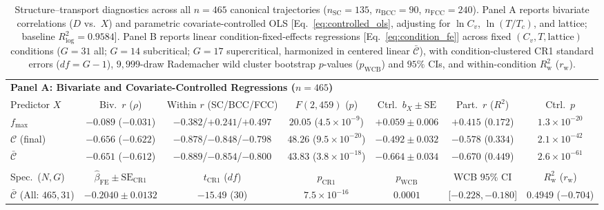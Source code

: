 \documentclass[aps,pre,reprint,superscriptaddress,amsmath,amssymb,floatfix]{revtex4-2}
\begin{document}
\begin{table}[t]
\caption{\label{tab:struct_transport}Structure--transport diagnostics across all $n = 465$ canonical trajectories ($n_{\mathrm{SC}} = 135$, $n_{\mathrm{BCC}} = 90$, $n_{\mathrm{FCC}} = 240$). Panel A reports bivariate correlations ($D$ vs.\ $X$) and parametric covariate-controlled OLS [Eq.~\eqref{eq:controlled_ols}, adjusting for $\ln C_v$, $\ln(T/T_c)$, and lattice; baseline $R^2_{\log} = 0.9584$]. Panel B reports linear condition-fixed-effects regressions [Eq.~\eqref{eq:condition_fe}] across fixed $(C_v, T, \text{lattice})$ conditions ($G = 31$ all; $G = 14$ subcritical; $G = 17$ supercritical, harmonized in centered linear $\bar{\mathcal{C}}$), with condition-clustered CR1 standard errors ($df = G - 1$), $9{,}999$-draw Rademacher wild cluster bootstrap $p$-values ($p_{\mathrm{WCB}}$) and $95\%$ CIs, and within-condition $R^2_{\mathrm{w}}$ ($r_{\mathrm{w}}$).}
\begingroup
\scriptsize
\setlength{\tabcolsep}{2.5pt}
\begin{ruledtabular}
\begin{tabular}{lcccccc}
\multicolumn{7}{l}{\textbf{Panel A: Bivariate and Covariate-Controlled Regressions ($n = 465$)}} \\
\colrule
Predictor $X$ & Biv.\ $r$ ($\rho$) & Within $r$ (SC/BCC/FCC) & $F(2,459)$ ($p$) & Ctrl.\ $b_X \pm \mathrm{SE}$ & Part.\ $r$ ($R^2$) & Ctrl.\ $p$ \\
\colrule
$f_{\max}$            & $-0.089$ ($-0.031$) & $-0.382$/$+0.241$/$+0.497$ & $20.05$ ($4.5{\times}10^{-9}$)  & $+0.059 \pm 0.006$ & $+0.415$ ($0.172$) & $1.3{\times}10^{-20}$ \\
$\mathcal{C}$ (final) & $-0.656$ ($-0.622$) & $-0.878$/$-0.848$/$-0.798$ & $48.26$ ($9.5{\times}10^{-20}$) & $-0.492 \pm 0.032$ & $-0.578$ ($0.334$) & $2.1{\times}10^{-42}$ \\
$\bar{\mathcal{C}}$   & $-0.651$ ($-0.612$) & $-0.889$/$-0.854$/$-0.800$ & $43.83$ ($3.8{\times}10^{-18}$) & $-0.664 \pm 0.034$ & $-0.670$ ($0.449$) & $2.6{\times}10^{-61}$ \\
\colrule
\multicolumn{7}{l}{\textbf{Panel B: Condition-Fixed-Effects Regressions [$\ln D_{ij} = \mu_j + \beta_{\mathrm{FE}}(X_{ij} - \bar{X}_j) + \epsilon_{ij}$]}} \\
\colrule
Spec.\ ($N, G$) & $\hat{\beta}_{\mathrm{FE}} \pm \mathrm{SE}_{\mathrm{CR1}}$ & $t_{\mathrm{CR1}}$ ($df$) & $p_{\mathrm{CR1}}$ & $p_{\mathrm{WCB}}$ & WCB $95\%$ CI & $R^2_{\mathrm{w}}$ ($r_{\mathrm{w}}$) \\
\colrule
$\bar{\mathcal{C}}$ (All: $465, 31$)     & $-0.2040 \pm 0.0132$ & $-15.49$ ($30$) & $7.5{\times}10^{-16}$ & $0.0001$ & [$-0.228,-0.180$] & $0.4949$ ($-0.704$) \\

\end{tabular}
\end{ruledtabular}
\end{table}
\end{document}
